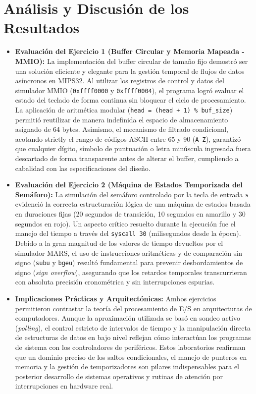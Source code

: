 \documentclass[12pt,a4paper]{article}
\begin{document}
\section{Análisis y Discusión de los Resultados} 

\begin{itemize}
    \item \textbf{Evaluación del Ejercicio 1 (Buffer Circular y Memoria Mapeada - MMIO):} 
    La implementación del buffer circular de tamaño fijo demostró ser una solución eficiente y elegante para la gestión temporal de flujos de datos asíncronos en MIPS32. Al utilizar los registros de control y datos del simulador MMIO (\texttt{0xffff0000} y \texttt{0xffff0004}), el programa logró evaluar el estado del teclado de forma continua sin bloquear el ciclo de procesamiento. La aplicación de aritmética modular (\texttt{head = (head + 1) \% buf\_size}) permitió reutilizar de manera indefinida el espacio de almacenamiento asignado de 64 bytes. Asimismo, el mecanismo de filtrado condicional, acotando strictly el rango de códigos ASCII entre 65 y 90 (\texttt{A-Z}), garantizó que cualquier dígito, símbolo de puntuación o letra minúscula ingresada fuera descartado de forma transparente antes de alterar el buffer, cumpliendo a cabalidad con las especificaciones del diseño. 

    \item \textbf{Evaluación del Ejercicio 2 (Máquina de Estados Temporizada del Semáforo):} 
    La simulación del semáforo controlado por la tecla de entrada \texttt{s} evidenció la correcta estructuración lógica de una máquina de estados basada en duraciones fijas (20 segundos de transición, 10 segundos en amarillo y 30 segundos en rojo). Un aspecto crítico resuelto durante la ejecución fue el manejo del tiempo a través del \texttt{syscall 30} (milisegundos desde la época). Debido a la gran magnitud de los valores de tiempo devueltos por el simulador MARS, el uso de instrucciones aritméticas y de comparación sin signo (\texttt{subu} y \texttt{bgeu}) resultó fundamental para prevenir desbordamientos de signo (\textit{sign overflow}), asegurando que los retardos temporales transcurrieran con absoluta precisión cronométrica y sin interrupciones espurias.

    \item \textbf{Implicaciones Prácticas y Arquitectónicas:} 
    Ambos ejercicios permitieron contrastar la teoría del procesamiento de E/S en arquitecturas de computadores. Aunque la aproximación utilizada se basó en sondeo activo (\textit{polling}), el control estricto de intervalos de tiempo y la manipulación directa de estructuras de datos en bajo nivel reflejan cómo interactúan los programas de sistema con los controladores de periféricos. Estos laboratorios reafirman que un dominio preciso de los saltos condicionales, el manejo de punteros en memoria y la gestión de temporizadores son pilares indispensables para el posterior desarrollo de sistemas operativos y rutinas de atención por interrupciones en hardware real. 
\end{itemize}
\end{document}
